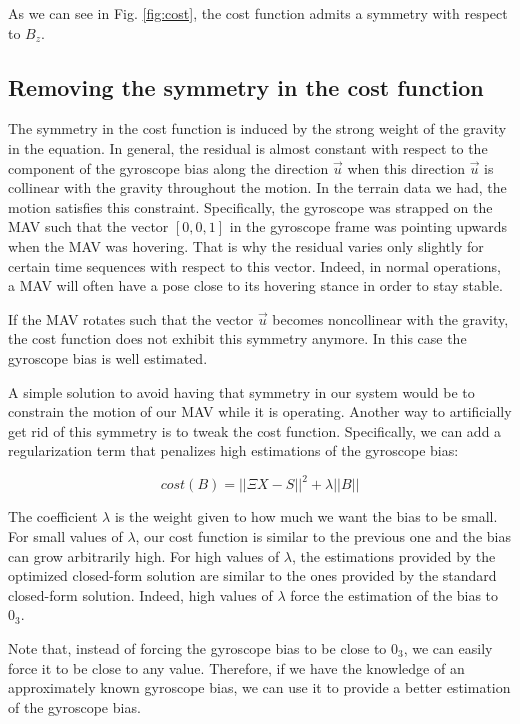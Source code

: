 \documentclass[letterpaper, 10 pt, conference]{ieeeconf}  %
\begin{document}
As we can see in Fig. \ref{fig:cost}, the cost function admits a symmetry with respect to $B_z$.

\subsection{Removing the symmetry in the cost function}

The symmetry in the cost function is induced by the strong weight of the gravity in the equation.
In general, the residual is almost constant with respect to the component of the gyroscope bias along the direction $\vec{u}$ when this direction $\vec{u}$ is collinear with the gravity throughout the motion.
In the terrain data we had, the motion satisfies this constraint.
Specifically, the gyroscope was strapped on the MAV such that the vector $[0,0,1]$ in the gyroscope frame was pointing upwards when the MAV was hovering.
That is why the residual varies only slightly for certain time sequences with respect to this vector.
Indeed, in normal operations, a MAV will often have a pose close to its hovering stance in order to stay stable.

If the MAV rotates such that the vector $\vec{u}$ becomes noncollinear with the gravity, the cost function does not exhibit this symmetry anymore.
In this case the gyroscope bias is well estimated.

A simple solution to avoid having that symmetry in our system would be to constrain the motion of our MAV while it is operating.
Another way to artificially get rid of this symmetry is to tweak the cost function.
Specifically, we can add a regularization term that penalizes high estimations of the gyroscope bias:

\begin{equation}
cost(B) = ||\Xi X - S||^2 + \lambda ||B||
\end{equation}

The coefficient $\lambda$ is the weight given to how much we want the bias to be small.
For small values of $\lambda$, our cost function is similar to the previous one and the bias can grow arbitrarily high.
For high values of $\lambda$, the estimations provided by the optimized closed-form solution are similar to the ones provided by the standard closed-form solution.
Indeed, high values of $\lambda$ force the estimation of the bias to $0_3$.

Note that, instead of forcing the gyroscope bias to be close to $0_3$, we can easily force it to be close to any value.
Therefore, if we have the knowledge of an approximately known gyroscope bias, we can use it to provide a better estimation of the gyroscope bias.
\end{document}
